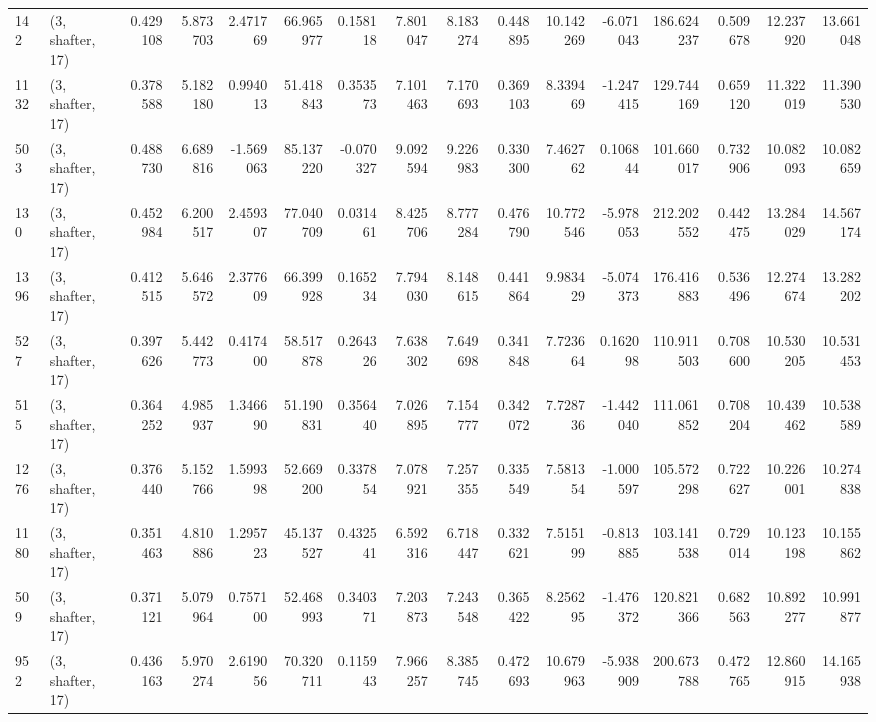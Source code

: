 \begin{tabular}{llrrrrrrrrrrrrrr}
142  &  (3, shafter, 17) &   0.429108 &   5.873703 &   2.471769 &     66.965977 &    0.158118 &    7.801047 &    8.183274 &  0.448895 &  10.142269 &  -6.071043 &   186.624237 &   0.509678 &  12.237920 &  13.661048 \\
1132 &  (3, shafter, 17) &   0.378588 &   5.182180 &   0.994013 &     51.418843 &    0.353573 &    7.101463 &    7.170693 &  0.369103 &   8.339469 &  -1.247415 &   129.744169 &   0.659120 &  11.322019 &  11.390530 \\
503  &  (3, shafter, 17) &   0.488730 &   6.689816 &  -1.569063 &     85.137220 &   -0.070327 &    9.092594 &    9.226983 &  0.330300 &   7.462762 &   0.106844 &   101.660017 &   0.732906 &  10.082093 &  10.082659 \\
130  &  (3, shafter, 17) &   0.452984 &   6.200517 &   2.459307 &     77.040709 &    0.031461 &    8.425706 &    8.777284 &  0.476790 &  10.772546 &  -5.978053 &   212.202552 &   0.442475 &  13.284029 &  14.567174 \\
1396 &  (3, shafter, 17) &   0.412515 &   5.646572 &   2.377609 &     66.399928 &    0.165234 &    7.794030 &    8.148615 &  0.441864 &   9.983429 &  -5.074373 &   176.416883 &   0.536496 &  12.274674 &  13.282202 \\
527  &  (3, shafter, 17) &   0.397626 &   5.442773 &   0.417400 &     58.517878 &    0.264326 &    7.638302 &    7.649698 &  0.341848 &   7.723664 &   0.162098 &   110.911503 &   0.708600 &  10.530205 &  10.531453 \\
515  &  (3, shafter, 17) &   0.364252 &   4.985937 &   1.346690 &     51.190831 &    0.356440 &    7.026895 &    7.154777 &  0.342072 &   7.728736 &  -1.442040 &   111.061852 &   0.708204 &  10.439462 &  10.538589 \\
1276 &  (3, shafter, 17) &   0.376440 &   5.152766 &   1.599398 &     52.669200 &    0.337854 &    7.078921 &    7.257355 &  0.335549 &   7.581354 &  -1.000597 &   105.572298 &   0.722627 &  10.226001 &  10.274838 \\
1180 &  (3, shafter, 17) &   0.351463 &   4.810886 &   1.295723 &     45.137527 &    0.432541 &    6.592316 &    6.718447 &  0.332621 &   7.515199 &  -0.813885 &   103.141538 &   0.729014 &  10.123198 &  10.155862 \\
509  &  (3, shafter, 17) &   0.371121 &   5.079964 &   0.757100 &     52.468993 &    0.340371 &    7.203873 &    7.243548 &  0.365422 &   8.256295 &  -1.476372 &   120.821366 &   0.682563 &  10.892277 &  10.991877 \\
952  &  (3, shafter, 17) &   0.436163 &   5.970274 &   2.619056 &     70.320711 &    0.115943 &    7.966257 &    8.385745 &  0.472693 &  10.679963 &  -5.938909 &   200.673788 &   0.472765 &  12.860915 &  14.165938 \\

\end{tabular}
